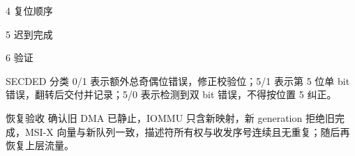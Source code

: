 \begin{chapteranswer}{4}
复位顺序
\end{chapteranswer}

\begin{chapteranswer}{5}
迟到完成
\end{chapteranswer}

\begin{chapteranswer}{6}
验证
\end{chapteranswer}

\begin{chapteranswer}{SECDED 分类}
0/1 表示额外总奇偶位错误，修正校验位；5/1 表示第 5 位单 bit 错误，翻转后交付并记录；5/0 表示检测到双 bit 错误，不得按位置 5 纠正。
\end{chapteranswer}

\begin{chapteranswer}{恢复验收}
确认旧 DMA 已静止，IOMMU 只含新映射，新 generation 拒绝旧完成，MSI-X 向量与新队列一致，描述符所有权与收发序号连续且无重复；随后再恢复上层流量。
\end{chapteranswer}
